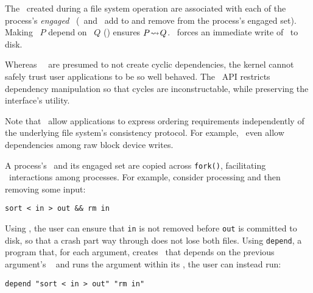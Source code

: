 The \chdescs\ created during a file system operation are associated
with each of the process's \emph{engaged} \opgroups\ (\pgEngage\ and
\pgDisengage\ add to and remove from the process's engaged set).
%
Making \opgroup\ $P$ depend on \opgroup\ $Q$ (\pgDepend)
ensures \(P\! \leadsto\! Q\).
%
\pgSync\ forces an immediate write of \anopgroup\ to disk.

Whereas \Kudos\ \modules\ are presumed to not create cyclic
dependencies, the kernel cannot safely trust user applications to be
so well behaved.
%
The \opgroup\ API restricts dependency manipulation so that cycles are
inconstructable, while preserving the interface's utility.

Note that \opgroups\ allow applications to express ordering
requirements independently of the underlying file system's consistency
protocol.
%
For example, \opgroups\ even allow dependencies among raw block device
writes.

A process's \opgroups\ and its engaged set are copied across \texttt{fork()},
facilitating \opgroup\ interactions among processes.
%
For example, consider processing and then removing some input:
%
\vspace{-0.5\baselineskip}
\begin{center}
\begin{small}
\verb+sort < in > out && rm in+
\end{small}
\end{center}
\vspace{-0.5\baselineskip}
%
Using \opgroups, the user can ensure that \texttt{in} is not removed
before \texttt{out} is committed to disk, so that a crash part way
through does not lose both files.
%
Using \texttt{depend}, a program that, for each argument,
%
creates \anopgroup\ that depends on the previous argument's \opgroup\
%
and runs the argument within its \opgroup,
%
the user can instead run:
%
\vspace{-0.5\baselineskip}
\begin{center}
\begin{small}
\verb+depend "sort < in > out" "rm in"+
\end{small}
\end{center}
\vspace{-0.5\baselineskip}


